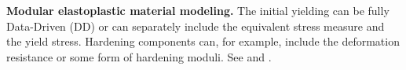 \documentclass{article}
\begin{document}
\textbf{Modular elastoplastic material modeling.} The initial yielding can be fully Data-Driven (DD) or can separately include the equivalent stress measure and the yield stress. Hardening components can, for example, include the deformation resistance or some form of hardening moduli. See \cite{vlassis2022component} and \cite{fuhg2023modular}.
\end{document}

